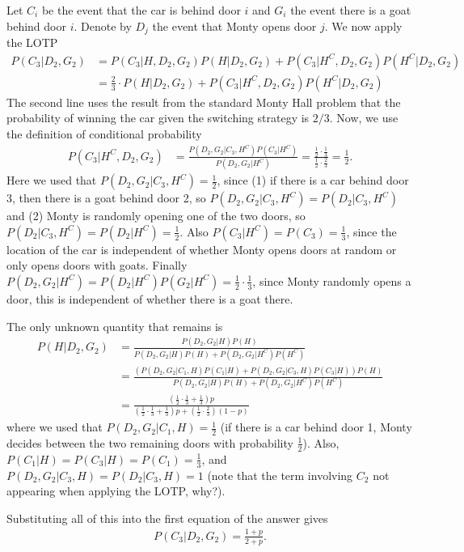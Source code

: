 \begin{exercise}[BH.2.41]
\begin{solution}
\begin{enumerate}
		Let $C_{i}$ be the event that the car is behind door $i$ and $G_{i}$ the event there is a goat behind door $i$. Denote by $D_j$ the event that Monty opens door $j$. We now apply the LOTP
		\begin{align*}
			P(C_{3}|D_{2},G_{2})& = P(C_{3}|H,D_{2},G_{2})P(H|D_{2},G_{2}) + P(C_{3}|H^{C},D_{2},G_{2})P(H^{C}|D_{2},G_{2})\\
			& = \frac{2}{3}\cdot P(H|D_{2},G_{2}) + P(C_{3}|H^{C},D_{2},G_{2})P(H^{C}|D_{2},G_{2})
		\end{align*}
		The second line uses the result from the standard Monty Hall problem that the probability of winning the car given the switching strategy is $2/3$. Now, we use the definition of conditional probability
		\begin{align*}
			P(C_{3}|H^{C},D_{2},G_{2}) &=\frac{P(D_{2},G_{2}|C_{3},H^{C})P(C_{3}|H^{C})}{P(D_{2},G_{2}|H^{C})}=\frac{\frac{1}{2}\cdot \frac{1}{3}}{\frac{1}{2}\cdot \frac{2}{3}}=\frac{1}{2}.
		\end{align*}
		Here we used that $P(D_{2},G_{2}|C_{3},H^{C})=\frac{1}{2}$, since (1) if there is a car behind door 3, then there is a goat behind door 2, so $P(D_{2},G_{2}|C_{3},H^{C})=P(D_{2}|C_{3},H^{C})$ and (2) Monty is randomly opening one of the two doors, so $P(D_{2}|C_{3},H^{C})=P(D_{2}|H^{C})=\frac{1}{2}$. Also $P(C_{3}|H^{C})=P(C_{3})=\frac{1}{3}$, since the location of the car is independent of whether Monty opens doors at random or only opens doors with goats. Finally $P(D_{2},G_{2}|H^{C})=P(D_{2}|H^{C})P(G_{2}|H^{C})=\frac{1}{2}\cdot \frac{1}{3}$, since Monty randomly opens a door, this is independent of whether there is a goat there.

		The only unknown quantity that remains is
		\begin{align*}
			P(H|D_{2},G_{2})& = \frac{P(D_{2},G_{2}|H)P(H)}{P(D_{2},G_{2}|H)P(H)+P(D_{2},G_{2}|H^C)P(H^C)} \\
			&= \frac{(P(D_{2},G_{2}|C_{1},H)P(C_{1}|H)+P(D_{2},G_{2}|C_{3},H)P(C_{3}|H))P(H)}{P(D_{2},G_{2}|H)P(H)+P(D_{2},G_{2}|H^C)P(H^C)}\tag*{(LOTP)} \\
			&= \frac{(\frac{1}{2}\cdot \frac{1}{3}+\frac{1}{3})p}{(\frac{1}{2}\cdot \frac{1}{3}+\frac{1}{3})p+(\frac{1}{2}\cdot \frac{2}{3})(1-p)}
		\end{align*}
		where we used that $P(D_{2},G_{2}|C_{1},H)=\frac{1}{2}$ (if there is a car behind door 1, Monty decides between the two remaining doors with probability $\frac{1}{2}$). Also, $P(C_{1}|H)=P(C_{3}|H)=P(C_{1})=\frac{1}{3}$, and $P(D_{2},G_{2}|C_{3},H)=P(D_{2}|C_{3},H)=1$ (note that the term involving $C_{2}$ not appearing when applying the LOTP, why?). 

		Substituting all of this into the first equation of the answer gives
		\begin{align*}
			P(C_{3}|D_2,G_2) = \frac{1+p}{2+p}.
		\end{align*}
	\end{enumerate}
\end{solution}
\end{exercise}

